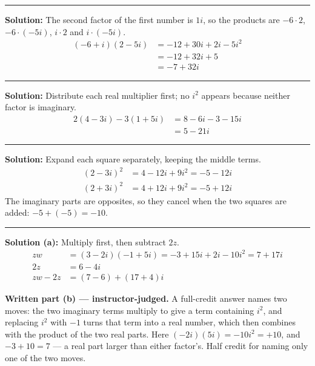 \documentclass[12pt]{article}
\begin{document}
\vspace{0.15cm}
\noindent\rule{\linewidth}{0.2pt}


\textbf{Solution:} The second factor of the first number is $1i$, so the
products are $-6 \cdot 2$, $-6 \cdot (-5i)$, $i \cdot 2$ and $i \cdot (-5i)$.
\begin{align*}
  (-6 + i)(2 - 5i) &= -12 + 30i + 2i - 5i^2 \\
                   &= -12 + 32i + 5 \\
                   &= -7 + 32i
\end{align*}

\vspace{0.15cm}
\noindent\rule{\linewidth}{0.2pt}


\textbf{Solution:} Distribute each real multiplier first; no $i^2$ appears
because neither factor is imaginary.
\begin{align*}
  2(4 - 3i) - 3(1 + 5i) &= 8 - 6i - 3 - 15i \\
                        &= 5 - 21i
\end{align*}

\vspace{0.15cm}
\noindent\rule{\linewidth}{0.2pt}


\textbf{Solution:} Expand each square separately, keeping the middle terms.
\begin{align*}
  (2 - 3i)^2 &= 4 - 12i + 9i^2 = -5 - 12i \\
  (2 + 3i)^2 &= 4 + 12i + 9i^2 = -5 + 12i
\end{align*}
The imaginary parts are opposites, so they cancel when the two squares are
added: $-5 + (-5) = -10$. 

\vspace{0.15cm}
\noindent\rule{\linewidth}{0.2pt}


\textbf{Solution (a):} Multiply first, then subtract $2z$.
\begin{align*}
  zw &= (3 - 2i)(-1 + 5i) = -3 + 15i + 2i - 10i^2 = 7 + 17i \\
  2z &= 6 - 4i \\
  zw - 2z &= (7 - 6) + (17 + 4)i
\end{align*}

\textbf{Written part (b) --- instructor-judged.} A full-credit answer names two
moves: the two imaginary terms multiply to give a term containing $i^2$, and
replacing $i^2$ with $-1$ turns that term into a real number, which then
combines with the product of the two real parts. Here $(-2i)(5i) = -10i^2 =
+10$, and $-3 + 10 = 7$ --- a real part larger than either factor's. Half credit
for naming only one of the two moves.
\end{document}

